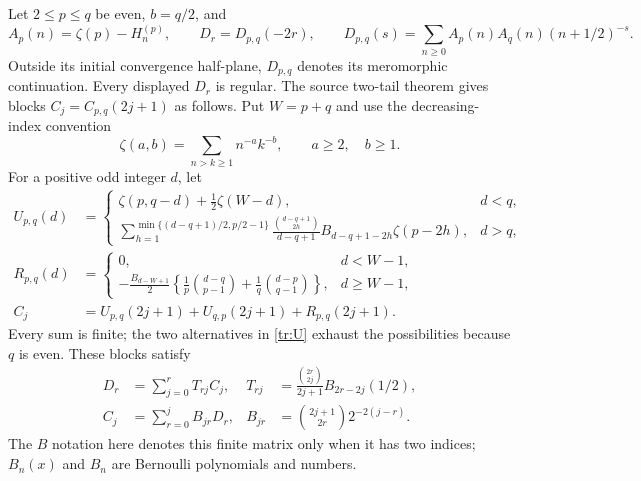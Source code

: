 Let $2\le p\le q$ be even, $b=q/2$, and
\[
 A_p(n)=\zeta(p)-H_n^{(p)},\qquad
 D_r=D_{p,q}(-2r),\qquad
 D_{p,q}(s)=\sum_{n\ge0}A_p(n)A_q(n)(n+1/2)^{-s}.
\]
Outside its initial convergence half-plane, $D_{p,q}$ denotes its
meromorphic continuation. Every displayed $D_r$ is regular. The source
two-tail theorem gives blocks $C_j=C_{p,q}(2j+1)$ as follows. Put $W=p+q$
and use the decreasing-index convention
\[
 \zeta(a,b)=\sum_{n>k\ge1}n^{-a}k^{-b},\qquad a\ge2,\quad b\ge1.
\]
For a positive odd integer $d$, let
\begin{align}
 U_{p,q}(d)&=
 \begin{cases}
 \zeta(p,q-d)+\frac12\zeta(W-d),&d<q,\\[4pt]
 \displaystyle\sum_{h=1}^{\min\{(d-q+1)/2,p/2-1\}}
 \frac{\binom{d-q+1}{2h}}{d-q+1}B_{d-q+1-2h}\zeta(p-2h),&d>q,
 \end{cases}\label{tr:U}\\
 R_{p,q}(d)&=
 \begin{cases}
 0,&d<W-1,\\[3pt]
 \displaystyle-\frac{B_{d-W+1}}2
 \left\{\frac1p\binom{d-q}{p-1}+\frac1q\binom{d-p}{q-1}\right\},
 &d\ge W-1,
 \end{cases}\label{tr:R}\\
 C_j&=U_{p,q}(2j+1)+U_{q,p}(2j+1)+R_{p,q}(2j+1).
 \label{tr:Cdefinition}
\end{align}
Every sum is finite; the two alternatives in \eqref{tr:U} exhaust the
possibilities because $q$ is even. These blocks satisfy
\begin{align}
 D_r&=\sum_{j=0}^r T_{rj}C_j,
 &T_{rj}&=\frac{\binom{2r}{2j}}{2j+1}B_{2r-2j}(1/2),
 \label{tr:forward}\\
 C_j&=\sum_{r=0}^j B_{jr}D_r,
 &B_{jr}&=\binom{2j+1}{2r}2^{-2(j-r)}.
 \label{tr:backward}
\end{align}
The $B$ notation here denotes this finite matrix only when it has two
indices; $B_n(x)$ and $B_n$ are Bernoulli polynomials and numbers.

